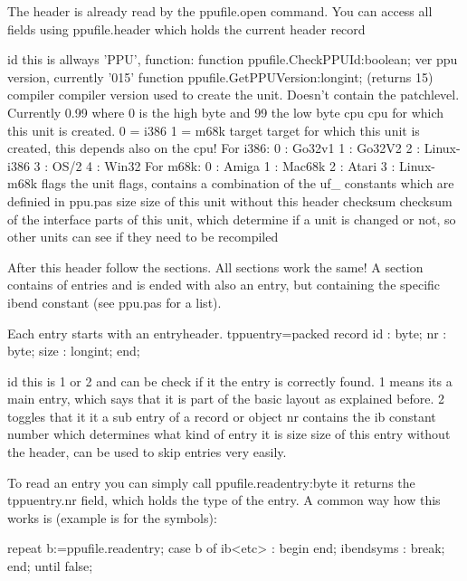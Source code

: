 \documentclass{report}
\begin{document}
{The header is already read by the ppufile.open command. You can access all
fields using ppufile.header which holds the current header record

id	 this is allways 'PPU', function:
          function ppufile.CheckPPUId:boolean;
ver	 ppu version, currently '015'
	  function ppufile.GetPPUVersion:longint; (returns 15)
compiler compiler version used to create the unit. Doesn't contain the
	 patchlevel. Currently 0.99 where 0 is the high byte and 99 the
	 low byte
cpu	 cpu for which this unit is created.
          0 = i386
          1 = m68k
target   target for which this unit is created, this depends also on the
	 cpu! 
	 For i386:
	  0 : Go32v1
	  1 : Go32V2
	  2 : Linux-i386
	  3 : OS/2
          4 : Win32
         For m68k:
	  0 : Amiga
	  1 : Mac68k
	  2 : Atari
	  3 : Linux-m68k
flags	 the unit flags, contains a combination of the uf_ constants which
	 are definied in ppu.pas
size	 size of this unit without this header
checksum checksum of the interface parts of this unit, which determine if
         a unit is changed or not, so other units can see if they need to
	 be recompiled


After this header follow the sections. All sections work the same! 
A section contains of entries and is ended with also an entry, but
containing the specific ibend constant (see ppu.pas for a list).

Each entry starts with an entryheader.
  tppuentry=packed record                                                       
    id   : byte;                                                                
    nr   : byte;                                                                
    size : longint;                                                             
  end;      

id	this is 1 or 2 and can be check if it the entry is correctly
	found. 1 means its a main entry, which says that it is part of the
	basic layout as explained before. 2 toggles that it it a sub entry
	of a record or object
nr	contains the ib constant number which determines what kind of
	entry it is
size	size of this entry without the header, can be used to skip entries
	very easily.


To read an entry you can simply call ppufile.readentry:byte it returns the
tppuentry.nr field, which holds the type of the entry. A common way how
this works is (example is for the symbols):

  repeat
    b:=ppufile.readentry;
    case b of
   ib<etc> : begin
             end;
 ibendsyms : break;
    end;
  until false;

}
\end{document}
